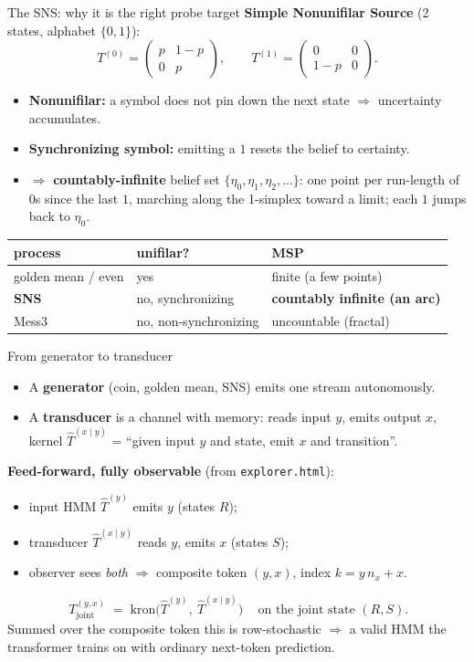\documentclass[aspectratio=169]{beamer}
\newcommand{\Tin}{\hat{T}^{(y)}}
\newcommand{\Ttr}{\hat{T}^{(x\mid y)}}
\begin{document}
\begin{frame}{The SNS: why it is the right probe target}
\textbf{Simple Nonunifilar Source} (2 states, alphabet $\{0,1\}$):
\[
T^{(0)}=\begin{pmatrix} p & 1-p\\ 0 & p\end{pmatrix},\qquad
T^{(1)}=\begin{pmatrix} 0 & 0\\ 1-p & 0\end{pmatrix}.
\]
\begin{itemize}
  \item \textbf{Nonunifilar:} a symbol does not pin down the next state $\Rightarrow$ uncertainty
        accumulates.
  \item \textbf{Synchronizing symbol:} emitting a $1$ resets the belief to certainty.
  \item $\Rightarrow$ \textbf{countably-infinite} belief set $\{\eta_0,\eta_1,\eta_2,\dots\}$: one
        point per run-length of $0$s since the last $1$, marching along the 1-simplex toward a
        limit; each $1$ jumps back to $\eta_0$.
\end{itemize}
\vspace{2mm}
\centering
\begin{tabular}{lll}
\toprule
process & unifilar? & MSP \\
\midrule
golden mean / even & yes & finite (a few points) \\
\textbf{SNS} & no, synchronizing & \textbf{countably infinite (an arc)} \\
Mess3 & no, non-synchronizing & uncountable (fractal) \\
\bottomrule
\end{tabular}
\end{frame}

\begin{frame}{From generator to transducer}
\begin{itemize}
  \item A \textbf{generator} (coin, golden mean, SNS) emits one stream autonomously.
  \item A \textbf{transducer} is a channel with memory: reads input $y$, emits output $x$,
        kernel $\Ttr$ = ``given input $y$ and state, emit $x$ and transition''.
\end{itemize}
\vspace{1mm}
\textbf{Feed-forward, fully observable} (from \texttt{explorer.html}):
\begin{itemize}
  \item input HMM $\Tin$ emits $y$ (states $R$);
  \item transducer $\Ttr$ reads $y$, emits $x$ (states $S$);
  \item observer sees \emph{both} $\Rightarrow$ composite token $(y,x)$, index $k=y\,n_x+x$.
\end{itemize}
\[
  \boxed{\,T_{\text{joint}}^{(y,x)} \;=\; \mathrm{kron}\!\big(\Tin,\ \Ttr\big)\,}
  \quad\text{on the joint state } (R,S).
\]
Summed over the composite token this is row-stochastic $\Rightarrow$ a valid HMM the transformer
trains on with ordinary next-token prediction.
\end{frame}
\end{document}
